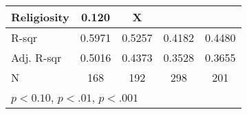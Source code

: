 {\begin{tabular}{l*{4}{c}}
    \addlinespace
    Religiosity         & 0.120\sym{*}   & X            &                &                         \\
    \midrule
    R-sqr               & 0.5971         & 0.5257       & 0.4182         & 0.4480                  \\
    Adj. R-sqr          & 0.5016         & 0.4373       & 0.3528         & 0.3655                  \\
    N                   & 168            & 192          & 298            & 201                     \\
    \bottomrule
    \multicolumn{4}{l}{\footnotesize \sym{*} \(p<0.10\), \sym{**} \(p<.01\), \sym{***} \(p<.001\)} \\
\end{tabular}
}
